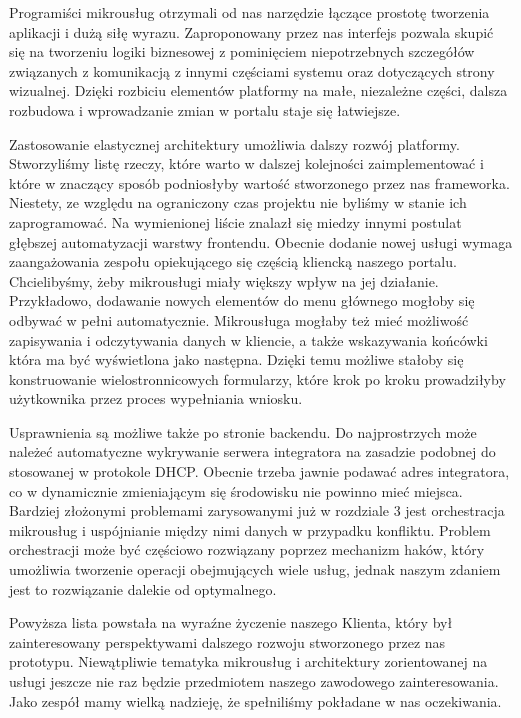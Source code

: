 \documentclass[licencjacka]{pracamgr}
\begin{document}
Programiści mikrousług otrzymali od nas narzędzie łączące prostotę tworzenia aplikacji
i dużą siłę wyrazu. Zaproponowany przez nas interfejs pozwala skupić się na tworzeniu
logiki biznesowej z pominięciem niepotrzebnych szczegółów związanych z komunikacją
z innymi częściami systemu oraz dotyczących strony wizualnej. Dzięki rozbiciu
elementów platformy na małe, niezależne części, dalsza rozbudowa i wprowadzanie zmian
w portalu staje się łatwiejsze.

Zastosowanie elastycznej architektury umożliwia dalszy rozwój platformy. Stworzyliśmy
listę rzeczy, które warto w dalszej kolejności zaimplementować i które w znaczący
sposób podniosłyby wartość stworzonego przez nas frameworka. Niestety, ze względu na
ograniczony czas projektu nie byliśmy w stanie ich zaprogramować. Na wymienionej liście
znalazł się miedzy innymi postulat głębszej automatyzacji warstwy frontendu. Obecnie
dodanie nowej usługi wymaga zaangażowania zespołu opiekującego się częścią kliencką
naszego portalu. Chcielibyśmy, żeby mikrousługi miały większy wpływ na jej działanie.
Przykładowo, dodawanie nowych elementów do menu głównego mogłoby się odbywać w pełni
automatycznie. Mikrousługa mogłaby też mieć możliwość zapisywania i odczytywania danych
w kliencie, a także wskazywania końcówki która ma być wyświetlona jako następna.
Dzięki temu możliwe stałoby się konstruowanie wielostronnicowych formularzy, które
krok po kroku prowadziłyby użytkownika przez proces wypełniania wniosku.

Usprawnienia są możliwe także po stronie backendu. Do najprostrzych może należeć
automatyczne wykrywanie serwera integratora na zasadzie podobnej do stosowanej
w protokole DHCP. Obecnie trzeba jawnie podawać adres integratora, co w dynamicznie
zmieniającym się środowisku nie powinno mieć miejsca. Bardziej złożonymi problemami
zarysowanymi już w rozdziale 3 jest orchestracja mikrousług i uspójnianie między
nimi danych w przypadku konfliktu. Problem orchestracji może być częściowo
rozwiązany poprzez mechanizm haków, który umożliwia tworzenie operacji obejmujących
wiele usług, jednak naszym zdaniem jest to rozwiązanie dalekie od optymalnego.

Powyższa lista powstała na wyraźne życzenie naszego Klienta, który był zainteresowany
perspektywami dalszego rozwoju stworzonego przez nas prototypu. Niewątpliwie tematyka
mikrousług i architektury zorientowanej na usługi jeszcze nie raz będzie przedmiotem
naszego zawodowego zainteresowania. Jako zespół mamy wielką nadzieję, że spełniliśmy
pokładane w nas oczekiwania.
\end{document}
